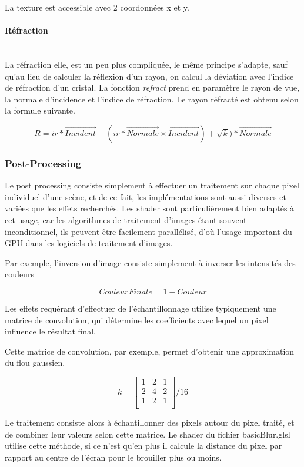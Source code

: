 \documentclass[pdftex, 11pt, a4paper, titlepage]{article}
\newcommand{\vect}[1]{\overrightarrow{#1}}
\begin{document}
La texture est accessible avec 2 coordonnées x et y.

\paragraph{Réfraction}\mbox{}\\
La réfraction elle, est un peu plus compliquée, le même principe s'adapte, 
sauf qu'au lieu de calculer la réflexion d'un rayon, on calcul la 
déviation avec l'indice de réfraction d'un cristal. La fonction \emph{refract}
 prend en paramètre le rayon de vue, la normale d'incidence et
 l'indice de réfraction. Le rayon réfracté est obtenu selon la
 formule suivante.

\begin{equation*}
R = ir * \vect{Incident} - (ir * \vect{Normale} \times \vect{Incident}) + \sqrt{k}) * \vect{Normale}
\end{equation*}

\subsubsection{Post-Processing}

Le post processing consiste simplement à effectuer un traitement sur
chaque pixel individuel d'une scène, et de ce fait, les implémentations sont
aussi diverses et variées que les effets recherchés. Les shader sont particulièrement
bien adaptés à cet usage, car les algorithmes de traitement d'images étant souvent
inconditionnel, ils peuvent être facilement parallélisé, d'où l'usage important du GPU
dans les logiciels de traitement d'images.

Par exemple, l'inversion d'image consiste simplement à inverser les intensités
des couleurs

\begin{equation*}
CouleurFinale = 1 - Couleur
\end{equation*}

Les effets requérant d'effectuer de l'échantillonnage utilise typiquement
une matrice de convolution, qui détermine les coefficients avec lequel
un pixel influence le résultat final.

Cette matrice de convolution, par exemple, permet d'obtenir une approximation
du flou gaussien.

\begin{equation*}
k =
\begin{bmatrix}
1 & 2 & 1\\
2 & 4 & 2\\
1 & 2 & 1\\
\end{bmatrix}
/ 16
\end{equation*}

Le traitement consiste alors à échantillonner des pixels autour du pixel traité,
et de combiner leur valeurs selon cette matrice.
Le shader du fichier basicBlur.glsl utilise cette méthode, si ce n'est qu'en plus
il calcule la distance du pixel par rapport au centre de l'écran pour le brouiller plus
ou moins.
\end{document}
